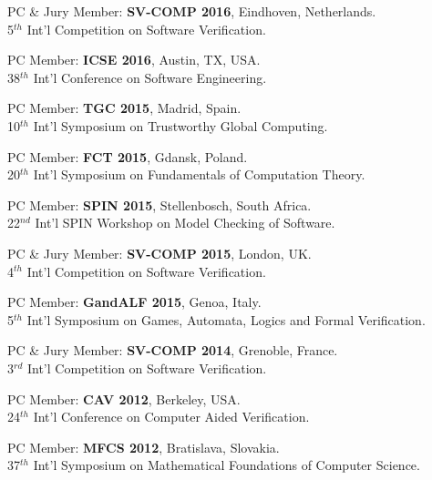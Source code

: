 \begin{resume}
\begin{list1}
\item

PC \& Jury Member: {\bf SV-COMP 2016}, Eindhoven, Netherlands.\\
5$^{th}$ Int'l Competition on Software Verification.

\item

PC Member:  {\bf ICSE 2016},   Austin, TX, USA.\\
38$^{th}$ Int'l Conference on Software Engineering.


\item

PC Member: {\bf TGC 2015}, Madrid, Spain.\\
10$^{th}$ Int'l Symposium on Trustworthy Global Computing.


\item

PC Member: {\bf FCT 2015},  Gdansk, Poland.\\
20$^{th}$ Int'l Symposium on Fundamentals of Computation Theory.

\item

PC Member: {\bf SPIN 2015}, Stellenbosch, South Africa.\\
22$^{nd}$ Int'l SPIN Workshop on Model Checking of Software.


\item

PC \& Jury Member: {\bf SV-COMP 2015}, London, UK.\\
4$^{th}$ Int'l Competition on Software Verification.

\item
PC Member: {\bf GandALF 2015}, Genoa, Italy.\\
5$^{th}$ Int'l Symposium on Games, Automata, Logics and Formal Verification.


\item

PC \& Jury Member: {\bf SV-COMP 2014}, Grenoble, France.\\
3$^{rd}$ Int'l Competition on Software Verification.


\item

PC Member: {\bf CAV 2012}, Berkeley, USA.\\
24$^{th}$ Int'l Conference on Computer Aided Verification.


\item
PC Member: {\bf MFCS 2012}, Bratislava, Slovakia.\\
37$^{th}$ Int'l Symposium on Mathematical Foundations of Computer Science.


\end{list1}
\end{resume}
